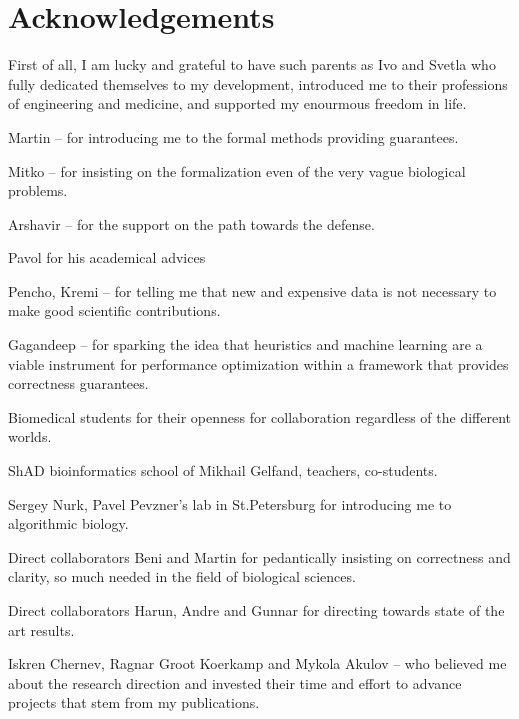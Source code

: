 
\bigskip

\begingroup
\let\clearpage\relax
\let\cleardoublepage\relax
\let\cleardoublepage\relax
\chapter*{Acknowledgements}

\def\thanks#1{%
\begingroup
\leftskip1em
\noindent #1
\par
\endgroup
}

First of all, I am lucky and grateful to have such parents as Ivo and Svetla who
fully dedicated themselves to my development, introduced me to their professions
of engineering and medicine, and supported my enourmous freedom in life.

Martin -- for introducing me to the formal methods providing guarantees.

Mitko -- for insisting on the formalization even of the very vague biological
problems.

Arshavir -- for the support on the path towards the defense.

Pavol for his academical advices

Pencho, Kremi -- for telling me that new and expensive data is not necessary to make
good scientific contributions.

Gagandeep -- for sparking the idea that heuristics and machine learning are a
viable instrument for performance optimization within a framework that provides
correctness guarantees.

Biomedical students for their openness for collaboration regardless of the
different worlds.

ShAD bioinformatics school of Mikhail Gelfand, teachers, co-students.

Sergey Nurk, Pavel Pevzner's lab in St.Petersburg for introducing me to
algorithmic biology.

Direct collaborators Beni and Martin for pedantically insisting on correctness
and clarity, so much needed in the field of biological sciences.

Direct collaborators Harun, Andre and Gunnar for directing towards state of the art results.

Iskren Chernev, Ragnar Groot Koerkamp and Mykola Akulov -- who believed me about
the research direction and invested their time and effort to advance projects
that stem from my publications.

